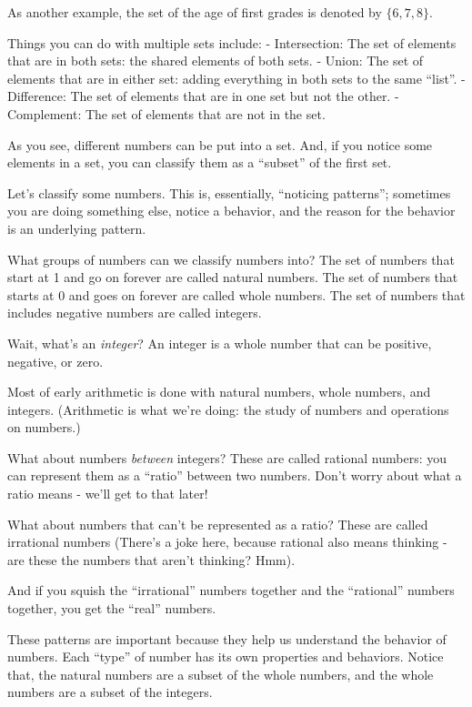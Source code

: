 As another example, the set of the age of first grades is denoted by $\{ 6, 7, 8 \}$.

Things you can do with multiple sets include:
- Intersection: The set of elements that are in both sets: the shared elements of both sets.
- Union: The set of elements that are in either set: adding everything in both sets to the same ``list''.
- Difference: The set of elements that are in one set but not the other.
- Complement: The set of elements that are not in the set.


As you see, different numbers can be put into a set. And, if you notice some elements in a set, you can classify them
as a ``subset'' of the first set.

Let's classify some numbers. This is, essentially, ``noticing patterns''; sometimes you are doing
something else, notice a behavior, and the reason for the behavior is an underlying pattern.

What groups of numbers can we classify numbers into?
The set of numbers that start at 1 and go on forever are called natural numbers.
The set of numbers that starts at 0 and goes on forever are called whole numbers.
The set of numbers that includes negative numbers are called integers.

Wait, what's an \textit{integer}? An integer is a whole number that can be positive, negative, or zero.

Most of early arithmetic is done with natural numbers, whole numbers, and integers. (Arithmetic is what we're doing: the study of numbers and operations on numbers.)


What about numbers \textit{between} integers? These are called rational numbers: you can represent them as
a ``ratio'' between two numbers.
Don't worry about what a ratio means - we'll get to that later!

What about numbers that can't be represented as a ratio? These are called irrational numbers (There's a joke here, because rational also means thinking - are these the numbers that aren't thinking? Hmm).

And if you squish the ``irrational'' numbers together and the ``rational'' numbers together, you get the ``real'' numbers.

These patterns are important because they help us understand the behavior of numbers. Each ``type'' of number has its own properties and behaviors.
Notice that, the natural numbers are a subset of the whole numbers, and the whole numbers are a subset of the integers.

